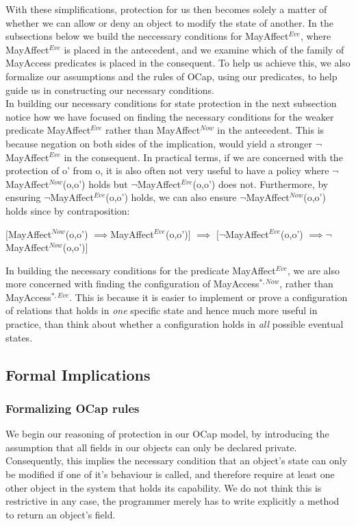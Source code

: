 \documentclass[a4paper,11pt, twoside,twocolumn]{article}
\newenvironment{logic}[1][null]
{\begin{flushleft} \small \label{#1}}
{\end{flushleft}}
\newcommand{\loimplies}{$\implies$}
\newcommand{\loneg}{$\neg$}
\newcommand{\ablock} {\null\qquad}
\begin{document}
With these simplifications, protection for us then becomes solely a matter of whether we can allow or deny an object to modify the state of another. In the subsections below we build the neccessary conditions for MayAffect$^{Eve}$, where MayAffect$^{Eve}$ is placed in the antecedent, and we examine which of the family of MayAccess predicates is placed in the consequent. To help us achieve this, we also formalize our assumptions and the rules of OCap, using our predicates, to help guide us in constructing our necessary conditions.\\

In building our necessary conditions for state protection in the next subsection notice how we have focused on finding the necessary conditions for the weaker predicate MayAffect$^{Eve}$ rather than MayAffect$^{Now}$ in the antecedent. This is because negation on both sides of the implication, would yield a stronger \loneg MayAffect$^{Eve}$ in the consequent. In practical terms, if we are concerned with the protection of o' from o, it is also often not very useful to have a policy where \loneg MayAffect$^{Now}$(o,o') holds but \loneg MayAffect$^{Eve}$(o,o') does not. Furthermore, by ensuring \loneg MayAffect$^{Eve}$(o,o') holds, we can also ensure \loneg MayAffect$^{Now}$(o,o') holds since by contraposition:

\begin{logic}
$[$MayAffect$^{Now}$(o,o') \loimplies MayAffect$^{Eve}$(o,o')$]$\linebreak
\ablock \loimplies\linebreak
$[$\loneg MayAffect$^{Eve}$(o,o') \loimplies \loneg MayAffect$^{Now}$(o,o')$]$\\
\end{logic}

In building the necessary conditions for the predicate MayAffect$^{Eve}$, we are also more concerned with finding the configuration of MayAccess$^{*,Now}$, rather than MayAccess$^{*,Eve}$. This is because it is easier to implement or prove a configuration of relations that holds in \textit{one} specific state and hence much more useful in practice, than think about whether a configuration holds in \textit{all} possible eventual states.\\
\subsection{Formal Implications}
\subsubsection{Formalizing OCap rules}
We begin our reasoning of protection in our OCap model, by introducing the assumption that all fields in our objects can only be declared private. Consequently, this implies the necessary condition that an object's state can only be modified if one of it's behaviour is called, and therefore require at least one other object in the system that holds its capability. We do not think this is restrictive in any case, the programmer merely has to write explicitly a method to return an object's field.
\end{document}
